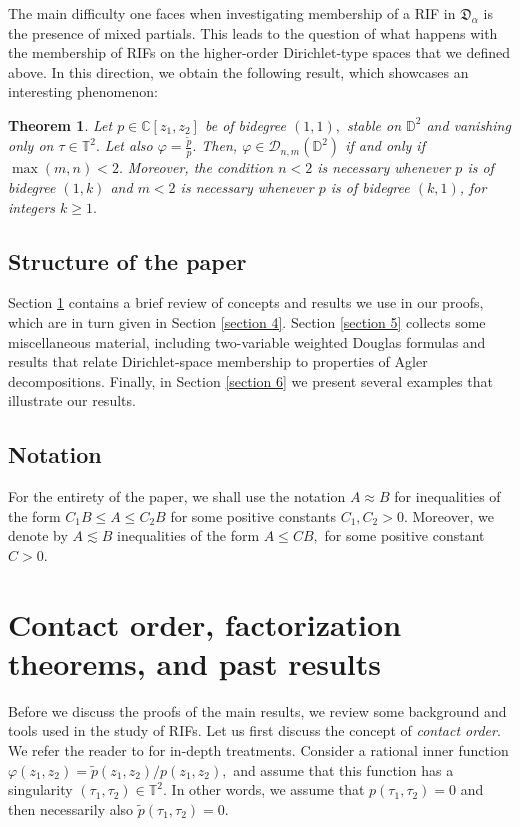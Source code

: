 \documentclass[11pt]{amsart}
\newtheorem{theorem}{Theorem}[section]
\numberwithin{equation}{section}
\begin{document}
The main difficulty one faces when investigating membership of a RIF in $\mathfrak{D}_{\alpha}$ is the presence of mixed partials. This leads to the question of what happens with the membership of RIFs on the higher-order Dirichlet-type spaces that we defined above. In this direction, we obtain the following result, which showcases an interesting phenomenon:
\begin{theorem} Let $p\in\mathbb{C}[z_1,z_2]$ be of bidegree $(1,1),$ stable on $\mathbb{D}^2$ and vanishing only on $\tau\in\mathbb{T}^2.$ Let also $\varphi=\frac{\widetilde{p}}{p}.$ Then, $\varphi\in \mathcal{D}_{n,m}(\mathbb{D}^2)$ if and only if $\max(m,n)<2.$
Moreover, the condition $n<2$ is necessary whenever $p$ is of bidegree $(1,k)$ and $m<2$ is necessary whenever $p$ is of bidegree $(k,1)$, for integers $k\ge1.$
\label{derivativedirichlet}
\end{theorem}


\subsection{Structure of the paper } Section \ref{Section 3} contains a brief review of concepts and results we use in our proofs, which are in turn given in Section \ref{section 4}. Section \ref{section 5}  collects some miscellaneous material, including two-variable weighted Douglas formulas and results that relate Dirichlet-space membership to properties of Agler decompositions. Finally, in Section \ref{section 6} we present several examples that illustrate our results.
\subsection{Notation} For the entirety of the paper, we shall use the notation $A\approx B$ for inequalities of the form $C_1B\leq A\leq C_2B $ for some positive constants $C_1,C_2>0.$ Moreover, we denote by $A\lesssim B$ inequalities of the form $A\leq CB,$ for some positive constant $C>0.$
\section{Contact order, factorization theorems, and past results} \label{Section 3}
Before we discuss the proofs of the main results, we review some background and tools used in the study of RIFs. Let us first discuss the concept of \textit{contact order}. We refer the reader to \cite{PLMS,Polonici} for in-depth treatments. Consider a rational inner function $\varphi(z_1,z_2)=\widetilde{p}(z_1,z_2)/p(z_1,z_2),$ and assume that this function has a singularity $(\tau_1,\tau_2)\in\mathbb{T}^2.$ In other words, we assume that $p(\tau_1,\tau_2)=0$ and then necessarily also $\tilde{p}(\tau_1,\tau_2)=0$. 
\end{document}
